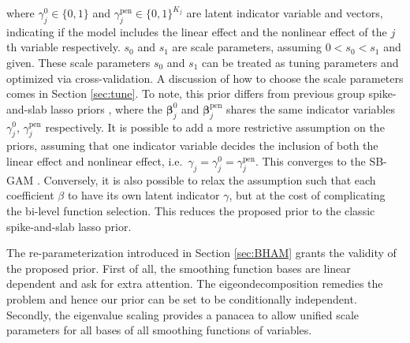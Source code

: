 \documentclass[AMA,STIX1COL,]{WileyNJD-v2}
\begin{document}
where \(\gamma^0_{j}\in\{0,1\}\) and
\(\gamma^\text{pen}_{j}\in \{0,1\}^{K_j}\) are latent indicator variable
and vectors, indicating if the model includes the linear effect and the
nonlinear effect of the \(j\)th variable respectively. \(s_0\) and
\(s_1\) are scale parameters, assuming \(0 < s_0 < s_1\) and given.
These scale parameters \(s_0\) and \(s_1\) can be treated as tuning
parameters and optimized via cross-validation. A discussion of how to
choose the scale parameters comes in Section \ref{sec:tune}. To note,
this prior differs from previous group spike-and-slab lasso priors
\citep{Tang2018, Tang2019}, where the \(\boldsymbol{\beta}^0_j\) and
\(\boldsymbol{\beta}^\text{pen}_j\) shares the same indicator variables
\(\gamma_j^0\), \(\gamma_j^\text{pen}\) respectively. It is possible to
add a more restrictive assumption on the priors, assuming that one
indicator variable decides the inclusion of both the linear effect and
nonlinear effect, i.e.~\(\gamma_j = \gamma^0_j = \gamma^\text{pen}_j\).
This converges to the SB-GAM \citep{Bai2021}. Conversely, it is also
possible to relax the assumption such that each coefficient \(\beta\) to
have its own latent indicator \(\gamma\), but at the cost of
complicating the bi-level function selection. This reduces the proposed
prior to the classic spike-and-slab lasso prior.

The re-parameterization introduced in Section \ref{sec:BHAM} grants the
validity of the proposed prior. First of all, the smoothing function
bases are linear dependent and ask for extra attention. The
eigeondecomposition remedies the problem and hence our prior can be set
to be conditionally independent. Secondly, the eigenvalue scaling
provides a panacea to allow unified scale parameters for all bases of
all smoothing functions of variables.
\end{document}
